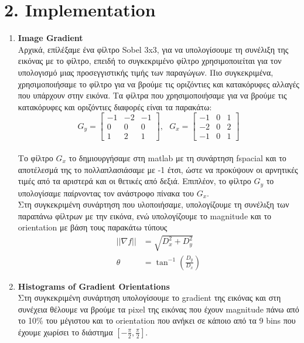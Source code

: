 \documentclass{article}
\newcommand{\tl}[1]{\textlatin{#1}}
\begin{document}
	\section*{2. \tl{Implementation}}
	\begin{enumerate}[label=\arabic*.]
		\item \textbf{\tl{Image Gradient}} \\
		Αρχικά, επίλέξαμε ένα φίλτρο \tl{Sobel} \tl{3x3}, για να υπολογίσουμε τη συνέλιξη της εικόνας με το φίλτρο, επειδή το συγκεκριμένο φίλτρο 
		χρησιμοποιείται για τον υπολογισμό μιας προσεγγιστικής τιμής των παραγώγων. Πιο συγκεκριμένα, χρησιμοποιήσαμε το φίλτρο για να βρούμε τις 
		οριζόντιες και κατακόρυφες αλλαγές που υπάρχουν στην εικόνα. Τα φίλτρα που χρησιμοποιήσαμε για να βρούμε τις κατακόρυφες και οριζόντιες
		διαφορές είναι τα παρακάτω:
		\[
		G_y=\begin{bmatrix}
			-1 & -2 & -1\\
			0 & 0 & 0\\
			1 & 2 & 1
		\end{bmatrix} , \ \ \ G_x=\begin{bmatrix}
			-1 & 0 & 1\\
			-2 & 0 & 2\\
			-1 & 0 & 1
		\end{bmatrix}
		\]
		\\
		\noindent
		Το φίλτρο $G_x$ το δημιουργήσαμε στη \tl{matlab} με τη συνάρτηση \tl{fspacial} και το αποτέλεσμά της το πολλαπλασιάσαμε με -1 έτσι, ώστε να 
		προκύψουν οι αρνητικές τιμές από τα αριστερά και οι θετικές από δεξιά. Επιπλέον, το φίλτρο $G_y$ το υπολογίσαμε παίρνοντας τον ανάστροφο 
		πίνακα του $G_x$.
		\\
		\noindent
		Στη συγκεκριμένη συνάρτηση που υλοποιήσαμε, υπολογίζουμε τη συνέλιξη των παραπάνω φίλτρων με την εικόνα, ενώ υπολογίζουμε το magnitude και
		το orientation με βάση τους παρακάτω τύπους
		\begin{align*}
			||\nabla f|| &= \sqrt{D_{x}^2 + D_{y}^2}	\\ 
			\theta &= \tan^{-1}\left( \frac{D_{y}}{D_{x}}\right) 
		\end{align*}
		
		\item \textbf{\tl{Histograms of Gradient Orientations}} \\
		Στη συγκεκριμένη συνάρτηση υπολογίσουμε το \tl{gradient} της εικόνας και στη συνέχεια θέλουμε να βρούμε τα \tl{pixel} της εικόνας που έχουν 
		\tl{magnitude} πάνω από το 10\% του μέγιστου και το \tl{orientation} που ανήκει σε κάποιο από τα 9 \tl{bins} που έχουμε χωρίσει το διάστημα 
		$\left[ -\frac{\pi}{2}, \frac{\pi}{2} \right]$.\\
		

\end{enumerate}
\end{document}
